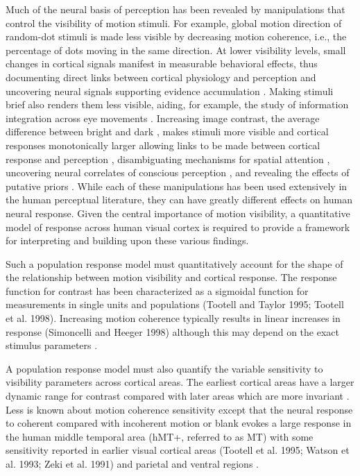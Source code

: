 \documentclass{report}
\begin{document}
Much of the neural basis of perception has been revealed by manipulations that control the visibility of motion stimuli. For example, global motion direction of random-dot stimuli is made less visible by decreasing motion coherence, i.e., the percentage of dots moving in the same direction. At lower visibility levels, small changes in cortical signals manifest in measurable behavioral effects, thus documenting direct links between cortical physiology and perception \citep{Britten1992-xy,Newsome1989-fr} and uncovering neural signals supporting evidence accumulation \citep{Huk2005-xg,Katz2016-xc,Roitman2002-mw,Shadlen1996-pr,Shadlen2001-uu}. Making stimuli brief also renders them less visible, aiding, for example, the study of information integration across eye movements \citep{Melcher2003-vw}. Increasing image contrast, the average difference between bright and dark \citep{Bex2002-it}, makes stimuli more visible and cortical responses monotonically larger allowing links to be made between cortical response and perception \citep{Boynton1999-jd,Ress2000-pa,Ress2003-lt}, disambiguating mechanisms for spatial attention \citep{Carrasco2000-es,Hara2014-tm,Hara2014-mv,Pestilli2011-gi}, uncovering neural correlates of conscious perception \citep{Lumer1998-qs,Wunderlich2005-ff}, and revealing the effects of putative priors \citep{Stocker2006-rk,Vintch2014-zu}. While each of these manipulations has been used extensively in the human perceptual literature, they can have greatly different effects on human neural response. Given the central importance of motion visibility, a quantitative model of response across human visual cortex is required to provide a framework for interpreting and building upon these various findings.

Such a population response model must quantitatively account for the shape of the relationship between motion visibility and cortical response. The response function for contrast has been characterized as a sigmoidal function for measurements in single units \citep{Albrecht1982-rq,Sclar1990-lk} and populations \citep{Avidan2002-jg,Boynton1996-ff,Boynton1999-jd,Gardner2005-pg,Logothetis2001-kk,Olman2004-dd} (Tootell and Taylor 1995; Tootell et al. 1998). Increasing motion coherence typically results in linear increases in response \citep{Aspell2005-tc,Britten1993-oh,Handel2007-xk,Rees2000-ul} (Simoncelli and Heeger 1998) although this may depend on the exact stimulus parameters \citep{Ajina2015-xm}.

A population response model must also quantify the variable sensitivity to visibility parameters across cortical areas. The earliest cortical areas have a larger dynamic range for contrast compared with later areas which are more invariant \citep{Avidan2002-jg,Cheng1994-ic,Rolls1986-wr,Sclar1990-lk}. Less is known about motion coherence sensitivity except that the neural response to coherent compared with incoherent motion or blank evokes a large response in the human middle temporal area (hMT+, referred to as MT) with some sensitivity reported in earlier visual cortical areas \citep{Ajina2015-xm,Costagli2014-kg,Dupont1994-yi,Heeger1999-ii} (Tootell et al. 1995; Watson et al. 1993; Zeki et al. 1991) and parietal and ventral regions \citep{Braddick2001-pp}.
\end{document}
